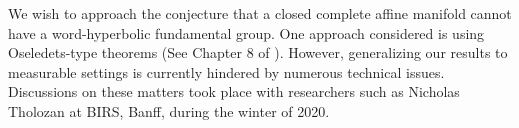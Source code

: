 

We wish to approach the conjecture that a closed complete affine manifold cannot have a word-hyperbolic fundamental group. One approach considered is using Oseledets-type theorems (See Chapter 8 of \cite{KH95}). However, generalizing our results to measurable settings is currently hindered by numerous technical issues. Discussions on these matters took place with researchers such as Nicholas Tholozan at BIRS, Banff, during the winter of 2020.






 

